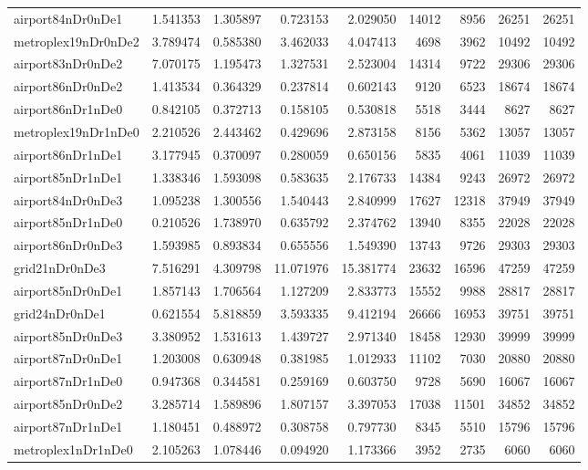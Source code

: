 \begin{longtable}{|l|r|r|r|r|r|r|r|r|}
airport84nDr0nDe1 & 1.541353 & 1.305897 & 0.723153 & 2.029050 & 14012 & 8956 & 26251 & 26251 \\
metroplex19nDr0nDe2 & 3.789474 & 0.585380 & 3.462033 & 4.047413 & 4698 & 3962 & 10492 & 10492 \\
airport83nDr0nDe2 & 7.070175 & 1.195473 & 1.327531 & 2.523004 & 14314 & 9722 & 29306 & 29306 \\
airport86nDr0nDe2 & 1.413534 & 0.364329 & 0.237814 & 0.602143 & 9120 & 6523 & 18674 & 18674 \\
airport86nDr1nDe0 & 0.842105 & 0.372713 & 0.158105 & 0.530818 & 5518 & 3444 & 8627 & 8627 \\
metroplex19nDr1nDe0 & 2.210526 & 2.443462 & 0.429696 & 2.873158 & 8156 & 5362 & 13057 & 13057 \\
airport86nDr1nDe1 & 3.177945 & 0.370097 & 0.280059 & 0.650156 & 5835 & 4061 & 11039 & 11039 \\
airport85nDr1nDe1 & 1.338346 & 1.593098 & 0.583635 & 2.176733 & 14384 & 9243 & 26972 & 26972 \\
airport84nDr0nDe3 & 1.095238 & 1.300556 & 1.540443 & 2.840999 & 17627 & 12318 & 37949 & 37949 \\
airport85nDr1nDe0 & 0.210526 & 1.738970 & 0.635792 & 2.374762 & 13940 & 8355 & 22028 & 22028 \\
airport86nDr0nDe3 & 1.593985 & 0.893834 & 0.655556 & 1.549390 & 13743 & 9726 & 29303 & 29303 \\
grid21nDr0nDe3 & 7.516291 & 4.309798 & 11.071976 & 15.381774 & 23632 & 16596 & 47259 & 47259 \\
airport85nDr0nDe1 & 1.857143 & 1.706564 & 1.127209 & 2.833773 & 15552 & 9988 & 28817 & 28817 \\
grid24nDr0nDe1 & 0.621554 & 5.818859 & 3.593335 & 9.412194 & 26666 & 16953 & 39751 & 39751 \\
airport85nDr0nDe3 & 3.380952 & 1.531613 & 1.439727 & 2.971340 & 18458 & 12930 & 39999 & 39999 \\
airport87nDr0nDe1 & 1.203008 & 0.630948 & 0.381985 & 1.012933 & 11102 & 7030 & 20880 & 20880 \\
airport87nDr1nDe0 & 0.947368 & 0.344581 & 0.259169 & 0.603750 & 9728 & 5690 & 16067 & 16067 \\
airport85nDr0nDe2 & 3.285714 & 1.589896 & 1.807157 & 3.397053 & 17038 & 11501 & 34852 & 34852 \\
airport87nDr1nDe1 & 1.180451 & 0.488972 & 0.308758 & 0.797730 & 8345 & 5510 & 15796 & 15796 \\
metroplex1nDr1nDe0 & 2.105263 & 1.078446 & 0.094920 & 1.173366 & 3952 & 2735 & 6060 & 6060 \\

\end{longtable}
